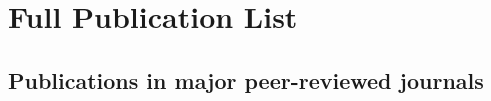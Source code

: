 \documentclass[11pt,letterpaper,sans]{moderncv}
\begin{document}
\pagebreak


\section{Full Publication List} %

%

\subsection{Publications in major peer-reviewed journals} \vspace{-0.3cm}
\end{document}
